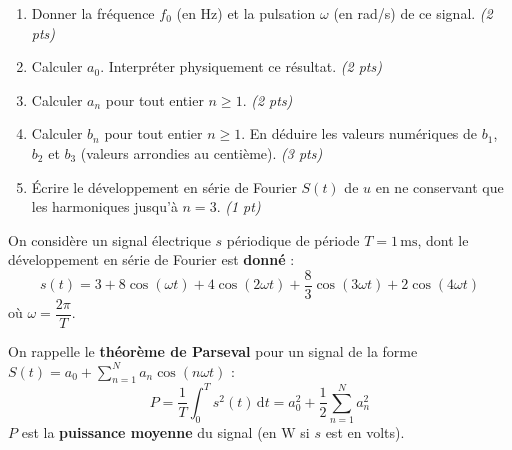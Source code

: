 \documentclass[a4paper,11pt]{article}
\newcommand{\dt}{\mathrm{d}t}
\begin{document}
\begin{enumerate}[label=\textbf{\arabic*.}]
  \item Donner la fréquence $f_0$ (en Hz) et la pulsation $\omega$ (en rad/s) de ce signal.
        \hfill \textit{(2 pts)}
  \begin{tcolorbox}[reponsebox, height=1.2cm]\end{tcolorbox}

  \item Calculer $a_0$. Interpréter physiquement ce résultat.
        \hfill \textit{(2 pts)}
  \begin{tcolorbox}[reponsebox, height=3cm]\end{tcolorbox}

  \item Calculer $a_n$ pour tout entier $n \geq 1$.
        \hfill \textit{(2 pts)}
  \begin{tcolorbox}[reponsebox, height=3.5cm]\end{tcolorbox}

  \item Calculer $b_n$ pour tout entier $n \geq 1$.
        En déduire les valeurs numériques de $b_1$, $b_2$ et $b_3$
        (valeurs arrondies au centième). \hfill \textit{(3 pts)}
  \begin{tcolorbox}[reponsebox, height=5.5cm]\end{tcolorbox}

  \item Écrire le développement en série de Fourier $S(t)$ de $u$ en ne conservant que les
        harmoniques jusqu'à $n = 3$. \hfill \textit{(1 pt)}
  \begin{tcolorbox}[reponsebox, height=2cm]\end{tcolorbox}
\end{enumerate}




\vfill 

\begin{tcolorbox}[exobox={Exercice 3 \hfill \normalfont\textit{(10 points)}}]
On considère un signal électrique $s$ périodique de période $T = 1\,\mathrm{ms}$,
dont le développement en série de Fourier est \textbf{donné} :
\[
  s(t) = 3 + 8\cos(\omega t) + 4\cos(2\omega t) + \frac{8}{3}\cos(3\omega t) + 2\cos(4\omega t)
\]
où $\omega = \dfrac{2\pi}{T}$.

\smallskip
On rappelle le \textbf{théorème de Parseval} pour un signal de la forme
$S(t) = a_0 + \displaystyle\sum_{n=1}^{N}a_n\cos(n\omega t)$ :
\[
  P = \frac{1}{T}\int_0^T s^2(t)\,\dt = a_0^2 + \frac{1}{2}\sum_{n=1}^{N} a_n^2
\]
$P$ est la \textbf{puissance moyenne} du signal (en $\mathrm{W}$ si $s$ est en volts).
\end{tcolorbox}
\end{document}
